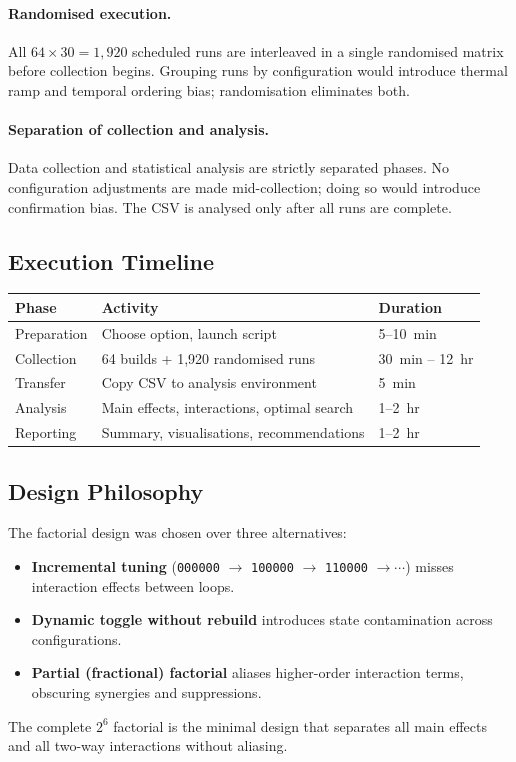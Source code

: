 \paragraph{Randomised execution.}
All $64 \times 30 = 1{,}920$ scheduled runs are interleaved in a single randomised
matrix before collection begins. Grouping runs by configuration would introduce
thermal ramp and temporal ordering bias; randomisation eliminates both.

\paragraph{Separation of collection and analysis.}
Data collection and statistical analysis are strictly separated phases. No
configuration adjustments are made mid-collection; doing so would introduce
confirmation bias. The CSV is analysed only after all runs are complete.

\subsection{Execution Timeline}

\begin{center}
\begin{tabular}{lll}
\toprule
Phase & Activity & Duration \\
\midrule
Preparation & Choose option, launch script & 5--10~min \\
Collection  & 64 builds + 1{,}920 randomised runs & 30~min -- 12~hr \\
Transfer    & Copy CSV to analysis environment & 5~min \\
Analysis    & Main effects, interactions, optimal search & 1--2~hr \\
Reporting   & Summary, visualisations, recommendations & 1--2~hr \\
\bottomrule
\end{tabular}
\end{center}

\subsection{Design Philosophy}

The factorial design was chosen over three alternatives:

\begin{itemize}
  \item \textbf{Incremental tuning} (\texttt{000000} $\to$ \texttt{100000} $\to$
        \texttt{110000} $\to \cdots$) misses interaction effects between loops.
  \item \textbf{Dynamic toggle without rebuild} introduces state contamination
        across configurations.
  \item \textbf{Partial (fractional) factorial} aliases higher-order interaction
        terms, obscuring synergies and suppressions.
\end{itemize}

The complete $2^6$ factorial is the minimal design that separates all main
effects and all two-way interactions without aliasing.


